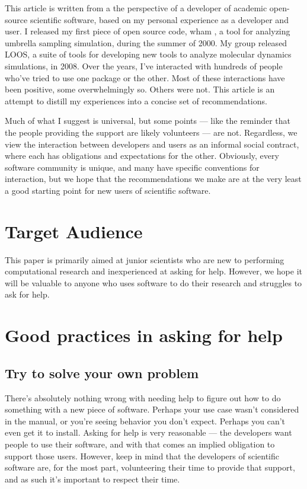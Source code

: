\documentclass[9pt,training]{livecoms}
\begin{document}
This article is written from a the perspective of a developer of academic
open-source scientific software, based on my personal experience as a developer
and user. I released my first piece of open source code, wham \cite{WHAM}, a
tool for analyzing umbrella sampling simulation,  during the summer of 2000.  My
group released LOOS\cite{Grossfield-2009, LOOS-JCC}, a suite of tools for
developing new tools to analyze molecular dynamics simulations, in 2008. Over
the years, I've interacted with hundreds of people who've tried to use one
package or the other. Most of these interactions have been positive, some
overwhelmingly so. Others were not. This article is an attempt to distill my
experiences into a concise set of recommendations.

Much of what I suggest is universal, but some points --- like the
reminder that the people providing the support are likely volunteers --- are
not.  Regardless, we view the interaction between developers and users as an
informal social contract, where each has obligations and expectations for the
other. Obviously, every software community is unique, and many have specific
conventions for interaction, but we hope that the recommendations we make are at
the very least a good starting point for new users of scientific software.



\section{Target Audience}

This paper is primarily aimed at junior scientists who are new to performing
computational research and inexperienced at asking for help. However, we hope it
will be valuable to anyone who uses software to do their research and struggles
to ask for help.

\section{Good practices in asking for help}

\subsection{Try to solve your own problem}
\label{ss:yourself}

There's absolutely nothing wrong with needing help to figure out how to do
something with a new piece of software. Perhaps your use case wasn't considered
in the manual, or you're seeing behavior you don't expect. Perhaps you can't
even get it to install. Asking for help is very reasonable --- the developers
want people to use their software, and with that comes an implied obligation to
support those users. However, keep in mind that the developers of scientific
software are, for the most part, volunteering their time to provide that
support, and as such it's important to respect their time.
\end{document}
